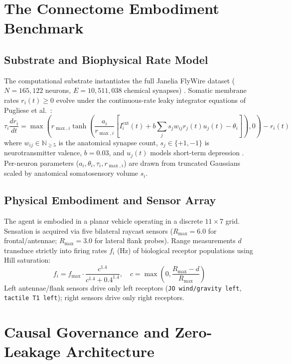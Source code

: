 \documentclass{article}
\begin{document}
\section{The Connectome Embodiment Benchmark}

\subsection{Substrate and Biophysical Rate Model}

The computational substrate instantiates the full Janelia FlyWire dataset ($N = 165,122$ neurons, $E = 10,511,038$ chemical synapses) \cite{dorkenwald2024neuronal, schlegel2024whole}. Somatic membrane rates $r_i(t) \ge 0$ evolve under the continuous-rate leaky integrator equations of Pugliese et al.\ \cite{pugliese2025whole}:
\begin{equation}
\tau_i \frac{dr_i}{dt} = \max\left( r_{\max,i} \tanh\left( \frac{a_i}{r_{\max,i}} \left[ I_i^{\text{ext}}(t) + b \sum_{j} s_j w_{ij} r_j(t) u_j(t) - \theta_i \right] \right), 0 \right) - r_i(t)
\end{equation}
where $w_{ij} \in \mathbb{N}_{\ge 5}$ is the anatomical synapse count, $s_j \in \{+1, -1\}$ is neurotransmitter valence, $b = 0.03$, and $u_j(t)$ models short-term depression \cite{tsodyks1997neural}. Per-neuron parameters ($a_i, \theta_i, \tau_i, r_{\max,i}$) are drawn from truncated Gaussians scaled by anatomical somatosensory volume $s_i$. 

\subsection{Physical Embodiment and Sensor Array}

The agent is embodied in a planar vehicle operating in a discrete $11 \times 7$ grid. Sensation is acquired via five bilateral raycast sensors ($R_{\max} = 6.0$ for frontal/antennae; $R_{\max} = 3.0$ for lateral flank probes). Range measurements $d$ transduce strictly into firing rates $f_i$ (Hz) of biological receptor populations using Hill saturation:
\begin{equation}
f_i = f_{\max} \cdot \frac{c^{1.4}}{c^{1.4} + 0.4^{1.4}}, \quad c = \max\left(0, \frac{R_{\max} - d}{R_{\max}}\right)
\end{equation}
Left antennae/flank sensors drive only left receptors (\texttt{JO wind/gravity left}, \texttt{tactile T1 left}); right sensors drive only right receptors.

\section{Causal Governance and Zero-Leakage Architecture}
\end{document}
